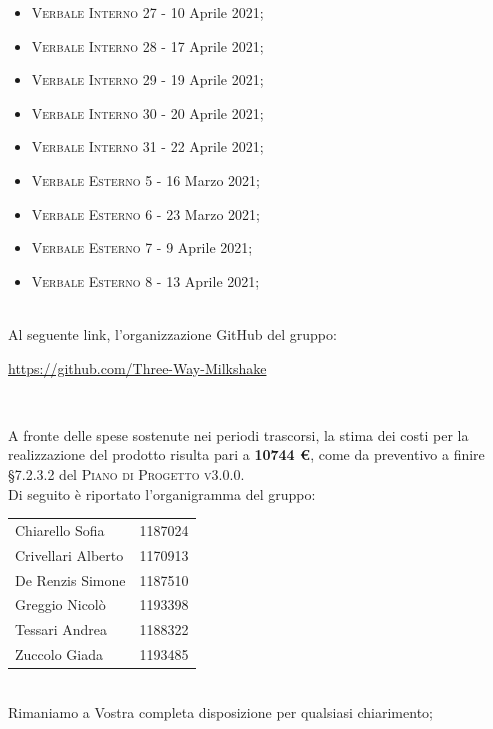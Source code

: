 \documentclass[10pt,stdletter,dateno,sigright]{newlfm}  %
\begin{document}
\begin{newlfm}
\begin{multicols}{2}
\begin{itemize}
            \item \textsc{Verbale Interno 27} - 10 Aprile 2021;
            \item \textsc{Verbale Interno 28} - 17 Aprile 2021;
            \item \textsc{Verbale Interno 29} - 19 Aprile 2021;
            \item \textsc{Verbale Interno 30} - 20 Aprile 2021;
            \item \textsc{Verbale Interno 31} - 22 Aprile 2021;
            \item \textsc{Verbale Esterno 5} - 16 Marzo 2021;
            \item \textsc{Verbale Esterno 6} - 23 Marzo 2021;
            \item \textsc{Verbale Esterno 7} - 9 Aprile 2021;
            \item \textsc{Verbale Esterno 8} - 13 Aprile 2021;
        \end{itemize}
    \end{multicols}


		\ \\

		Al seguente link, l'organizzazione GitHub del gruppo:
		\begin{center}
			\url{https://github.com/Three-Way-Milkshake}
		\end{center}
		\

        A fronte delle spese sostenute nei periodi trascorsi, la stima dei costi per la realizzazione del prodotto risulta pari a \textbf{10744 \euro}, come da preventivo a finire \S 7.2.3.2 del \textsc{Piano di Progetto v3.0.0}.
        \\

        Di seguito \`e riportato l'organigramma del gruppo:
        \begin{center}
            \begin{tabular}{l | l}
                Chiarello Sofia & 1187024
                \\
                Crivellari Alberto & 1170913
                \\
                De Renzis Simone & 1187510
                \\
                Greggio Nicolò & 1193398
                \\
                Tessari Andrea & 1188322
                \\
                Zuccolo Giada & 1193485
                \\
            \end{tabular}
        \end{center}
        \ \newline
        \\Rimaniamo a Vostra completa disposizione per qualsiasi chiarimento;

    \end{newlfm}
\end{document}
